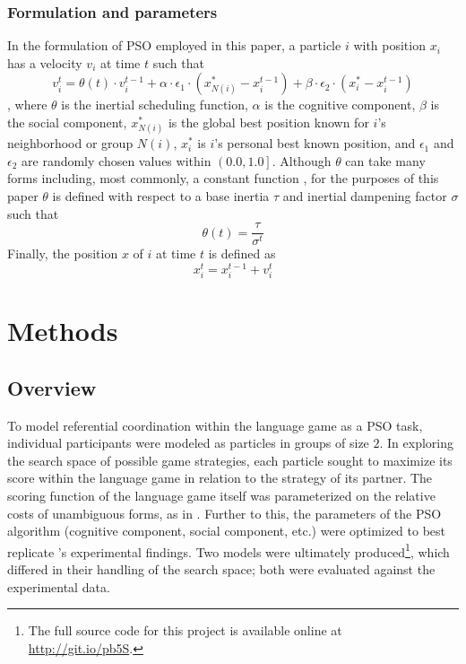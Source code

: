 \documentclass[12pt,a4paper]{article}
\begin{document}
\subsubsection{Formulation and parameters}
\label{sec:2.2.3}
In the formulation of PSO employed in this paper, a particle $i$ with position $x_i$ has a velocity $v_i$ at time $t$ such that
\begin{equation}
v_i^t = \theta(t) \cdot v_i^{t-1} + \alpha \cdot \epsilon_1 \cdot (x_{N(i)}^* - x_i^{t-1}) + \beta \cdot \epsilon_2 \cdot (x_i^* - x_i^{t-1})
\end{equation},
where $\theta$ is the inertial scheduling function, $\alpha$ is the cognitive component, $\beta$ is the social component, $x_{N(i)}^*$ is the global best position known for $i$'s neighborhood or group $N(i)$, $x_i^*$ is $i$'s personal best known position, and $\epsilon_1$ and $\epsilon_2$ are randomly chosen values within $\left(0.0, 1.0\right]$. Although $\theta$ can take many forms including, most commonly, a constant function \citep{yang2014}, for the purposes of this paper $\theta$ is defined with respect to a base inertia $\tau$ and inertial dampening factor $\sigma$ such that
\begin{equation}
\theta(t) = \frac{\tau}{\sigma^t} 
\end{equation}
Finally, the position $x$ of $i$ at time $t$ is defined as
\begin{equation}
x_i^t = x_i^{t-1} + v_i^t 
\end{equation}

\section{Methods}

\subsection{Overview}

To model referential coordination within the \citeauthor{rohde2012} language game as a PSO task, individual participants were modeled as particles in groups of size $2$. In exploring the search space of possible game strategies, each particle sought to maximize its score within the language game in relation to the strategy of its partner. The scoring function of the language game itself was parameterized on the relative costs of unambiguous forms, as in \citeauthor{rohde2012}. Further to this, the parameters of the PSO algorithm (cognitive component, social component, etc.) were optimized to best replicate \citeauthor{rohde2012}'s experimental findings. Two models were ultimately produced\footnote{The full source code for this project is available online at \url{http://git.io/pb5S}.}, which differed in their handling of the search space; both were evaluated against the experimental data.
\end{document}
